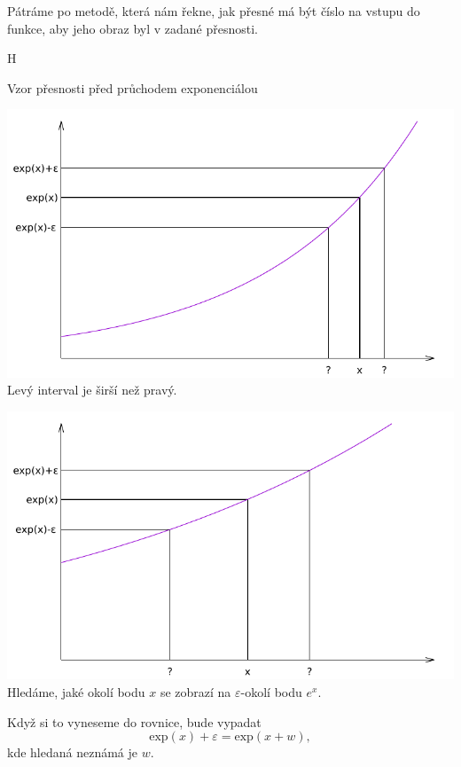 Pátráme po metodě, která nám řekne, jak přesné má být číslo na vstupu do funkce, aby jeho obraz byl v zadané přesnosti.

\begin{myfigure}{H}
\caption{Vzor přesnosti před průchodem exponenciálou}
\includegraphics[width=\linewidth]{graphics/exp2.pdf}\label{fig:exp2}
Levý interval je širší než pravý.

\includegraphics[width=\linewidth]{graphics/exp3.pdf}\label{fig:exp3}
Hledáme, jaké okolí bodu $x$ se zobrazí na $\varepsilon$-okolí bodu $e^x$.
\end{myfigure}

Když si to vyneseme do rovnice, bude vypadat
\begin{equation}\label{invpresexp}
\mathrm{exp}(x)+\varepsilon=\mathrm{exp}(x+w),
\end{equation}
kde hledaná neznámá je $w$.


